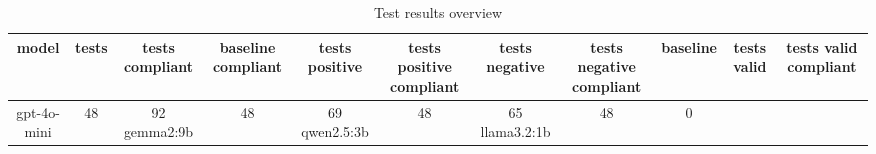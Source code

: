 
  \begin{table}[h!]
  \centering
  \begin{tabular}{|c|c|c|c|c|c|c|c|c|c|c|}
  \hline
  model & tests & tests compliant & baseline compliant & tests positive & tests positive compliant & tests negative & tests negative compliant & baseline & tests valid & tests valid compliant \\
  \hline
  gpt-4o-mini & 48 & 92%
\hline
gemma2:9b & 48 & 69%
\hline
qwen2.5:3b & 48 & 65%
\hline
llama3.2:1b & 48 & 0%
  \end{tabular}
  \caption{Test results overview}
  
  \end{table}
  